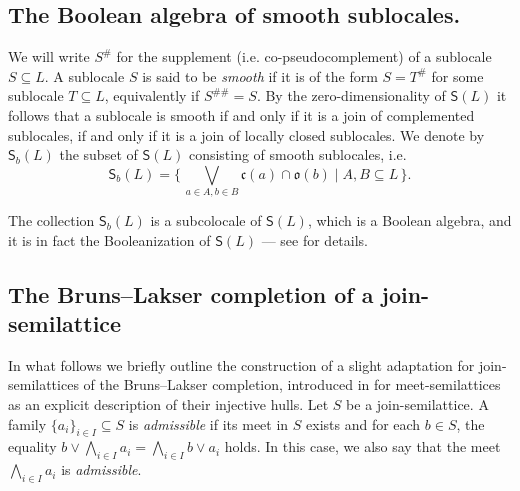 \documentclass[11pt,a4paper,reqno]{amsart}
\newcommand{\bigset}[1]{\bigl\{\,#1\,\bigr\}}
\newcommand{\tbigwedge}{\mathop{\textstyle \bigwedge }}%
\newcommand{\tbigvee}{\mathop{\textstyle \bigvee }}%
\def\SS{\mathsf{S}}
\def\cl{\mathfrak{c}}
\def\op{\mathfrak{o}}
\theoremstyle{definition}
\theoremstyle{remark}
\begin{document}
\subsection{The Boolean algebra of smooth sublocales.}\label{sb_prelim}

We  will write $S^{\#}$ for the supplement (i.e. co-pseudocomplement) of a sublocale $S\subseteq L$. A sublocale $S$ is said to be \emph{smooth} if it is of the form $S=T^{\#}$ for some sublocale $T\subseteq L$, equivalently if $S^{\#\#}=S$. By the zero-dimensionality of $\SS(L)$ it follows that a sublocale is smooth if and only if it is a join of complemented sublocales, if and only if it is a join of locally closed sublocales.
We denote by $\SS_b(L)$ the subset of $\SS(L)$ consisting of smooth sublocales, i.e.
$$\SS_b(L)=\bigset{ \tbigvee_{a\in A,b\in B} \cl(a)\cap \op(b)\mid A,B \subseteq L}.$$

The collection $\SS_b(L)$ is a subcolocale of $\SS(L)$, which is a Boolean algebra, and it is in fact the Booleanization of $\SS(L)$ --- see \cite{Arrieta2022}
 for details.

 \subsection{The Bruns--Lakser completion of a join-semilattice}

\label{brunslakser}
In what follows we briefly outline the construction of a slight adaptation for join-semilattices of the Bruns--Lakser completion, introduced in \cite{BrunsLakser1970} for meet-semilattices as an explicit description of their injective hulls. Let $S$ be a join-semilattice. A family $\{a_i\}_{i\in I}\subseteq S$ is \emph{admissible} if its meet in $S$ exists and for each $b\in S$, the  equality  
$b\vee \tbigwedge_{i\in I}a_i = \tbigwedge_{i\in I} b\vee a_i$ holds. In this case, we also say that the meet $\tbigwedge_{i\in I} a_i$ is \emph{admissible}.
\end{document}
